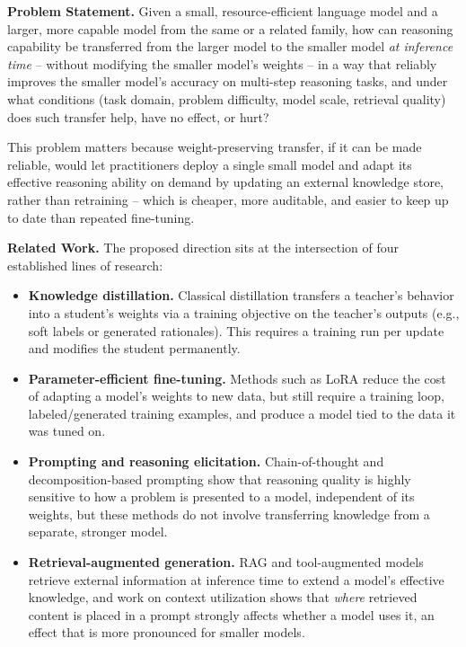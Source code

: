 \documentclass[a4, 12pt]{article}
\begin{document}
\textbf{Problem Statement.} Given a small, resource-efficient language model and a larger, more capable model from the same or a related family, how can reasoning capability be transferred from the larger model to the smaller model \emph{at inference time} -- without modifying the smaller model's weights -- in a way that reliably improves the smaller model's accuracy on multi-step reasoning tasks, and under what conditions (task domain, problem difficulty, model scale, retrieval quality) does such transfer help, have no effect, or hurt?

This problem matters because weight-preserving transfer, if it can be made reliable, would let practitioners deploy a single small model and adapt its effective reasoning ability on demand by updating an external knowledge store, rather than retraining -- which is cheaper, more auditable, and easier to keep up to date than repeated fine-tuning.

\textbf{Related Work.} The proposed direction sits at the intersection of four established lines of research:

\begin{itemize}
    \item \textbf{Knowledge distillation.} Classical distillation \cite{hinton2015distilling} transfers a teacher's behavior into a student's weights via a training objective on the teacher's outputs (e.g., soft labels or generated rationales). This requires a training run per update and modifies the student permanently.
    \item \textbf{Parameter-efficient fine-tuning.} Methods such as LoRA \cite{hu2021lora} reduce the cost of adapting a model's weights to new data, but still require a training loop, labeled/generated training examples, and produce a model tied to the data it was tuned on.
    \item \textbf{Prompting and reasoning elicitation.} Chain-of-thought \cite{wei2022chain} and decomposition-based prompting \cite{zhou2023leasttomost} show that reasoning quality is highly sensitive to how a problem is presented to a model, independent of its weights, but these methods do not involve transferring knowledge from a separate, stronger model.
    \item \textbf{Retrieval-augmented generation.} RAG \cite{lewis2020retrieval} and tool-augmented models \cite{schick2023toolformer} retrieve external information at inference time to extend a model's effective knowledge, and work on context utilization \cite{liu2023lost} shows that \emph{where} retrieved content is placed in a prompt strongly affects whether a model uses it, an effect that is more pronounced for smaller models.
\end{itemize}
\end{document}

